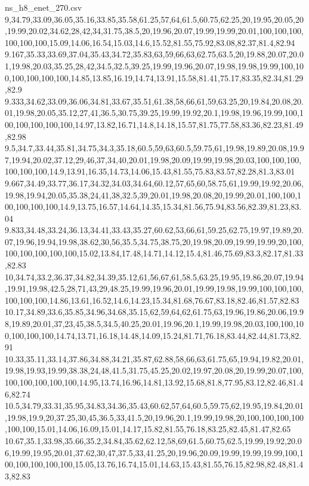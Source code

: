 \begin{filecontents*}[overwrite]{ns_h8_enet_270.csv}
9,34.79,33.09,36.05,35.16,33.85,35.58,61.25,57,64,61.5,60.75,62.25,20,19.95,20.05,20,19.99,20.02,34.62,28,42,34,31.75,38.5,20,19.96,20.07,19.99,19.99,20.01,100,100,100,100,100,100,15.09,14.06,16.54,15.03,14.6,15.52,81.55,75.92,83.08,82.37,81.4,82.94
9.167,35.33,33.69,37.04,35.43,34.72,35.83,63,59,66,63,62.75,63.5,20,19.88,20.07,20.01,19.98,20.03,35.25,28,42,34.5,32.5,39.25,19.99,19.96,20.07,19.98,19.98,19.99,100,100,100,100,100,100,14.85,13.85,16.19,14.74,13.91,15.58,81.41,75.17,83.35,82.34,81.29,82.9
9.333,34.62,33.09,36.06,34.81,33.67,35.51,61.38,58,66,61,59,63.25,20,19.84,20.08,20.01,19.98,20.05,35.12,27,41,36.5,30.75,39.25,19.99,19.92,20.1,19.98,19.96,19.99,100,100,100,100,100,100,14.97,13.82,16.71,14.8,14.18,15.57,81.75,77.58,83.36,82.23,81.49,82.98
9.5,34.7,33.44,35.81,34.75,34.3,35.18,60.5,59,63,60.5,59.75,61,19.98,19.89,20.08,19.97,19.94,20.02,37.12,29,46,37,34,40,20.01,19.98,20.09,19.99,19.98,20.03,100,100,100,100,100,100,14.9,13.91,16.35,14.73,14.06,15.43,81.55,75.83,83.57,82.28,81.3,83.01
9.667,34.49,33.77,36.17,34.32,34.03,34.64,60.12,57,65,60,58.75,61,19.99,19.92,20.06,19.98,19.94,20.05,35.38,24,41,38,32.5,39,20.01,19.98,20.08,20,19.99,20.01,100,100,100,100,100,100,14.9,13.75,16.57,14.64,14.35,15.34,81.56,75.94,83.56,82.39,81.23,83.04
9.833,34.48,33.24,36.13,34.41,33.43,35.27,60.62,53,66,61,59.25,62.75,19.97,19.89,20.07,19.96,19.94,19.98,38.62,30,56,35.5,34.75,38.75,20,19.98,20.09,19.99,19.99,20,100,100,100,100,100,100,15.02,13.84,17.48,14.71,14.12,15.4,81.46,75.69,83.3,82.17,81.33,82.83
10,34.74,33.2,36.37,34.82,34.39,35.12,61,56,67,61,58.5,63.25,19.95,19.86,20.07,19.94,19.91,19.98,42.5,28,71,43,29,48.25,19.99,19.96,20.01,19.99,19.98,19.99,100,100,100,100,100,100,14.86,13.61,16.52,14.6,14.23,15.34,81.68,76.67,83.18,82.46,81.57,82.83
10.17,34.89,33.6,35.85,34.96,34.68,35.15,62,59,64,62,61.75,63,19.96,19.86,20.06,19.98,19.89,20.01,37,23,45,38.5,34.5,40.25,20.01,19.96,20.1,19.99,19.98,20.03,100,100,100,100,100,100,14.74,13.71,16.18,14.48,14.09,15.24,81.71,76.18,83.44,82.44,81.73,82.91
10.33,35.11,33.14,37.86,34.88,34.21,35.87,62.88,58,66,63,61.75,65,19.94,19.82,20.01,19.98,19.93,19.99,38.38,24,48,41.5,31.75,45.25,20.02,19.97,20.08,20,19.99,20.07,100,100,100,100,100,100,14.95,13.74,16.96,14.81,13.92,15.68,81.8,77.95,83.12,82.46,81.46,82.74
10.5,34.79,33.31,35.95,34.83,34.36,35.43,60.62,57,64,60.5,59.75,62,19.95,19.84,20.01,19.98,19.9,20,37.25,30,45,36.5,33,41.5,20,19.96,20.1,19.99,19.98,20,100,100,100,100,100,100,15.01,14.06,16.09,15.01,14.17,15.82,81.55,76.18,83.25,82.45,81.47,82.65
10.67,35.1,33.98,35.66,35.2,34.84,35.62,62.12,58,69,61.5,60.75,62.5,19.99,19.92,20.06,19.99,19.95,20.01,37.62,30,47,37.5,33,41.25,20,19.96,20.09,19.99,19.99,19.99,100,100,100,100,100,100,15.05,13.76,16.74,15.01,14.63,15.43,81.55,76.15,82.98,82.48,81.43,82.83

\end{filecontents*}
